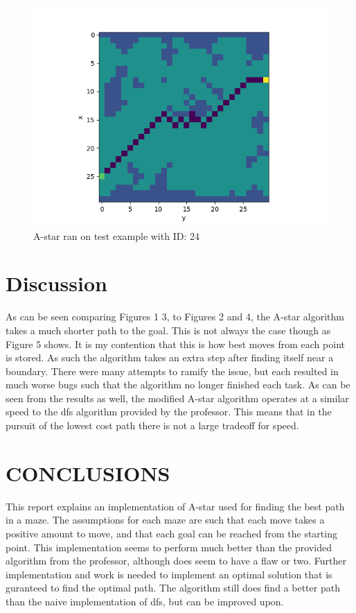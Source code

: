 \documentclass[letterpaper, 10 pt, conference]{ieeeconf}   %
\begin{document}
\begin{figure}[thpb]
	\centering
	\includegraphics[scale=0.5]{images/FAILA.png}
	\caption{A-star ran on test example with ID: 24}
	\label{figurelabel}
\end{figure}

\section{Discussion}
As can be seen comparing Figures 1  3, to Figures 2 and 4, the A-star algorithm takes a much shorter path to the goal. This is not always the case though as Figure 5 shows. It is my contention that this is how best moves from each point is stored. As such the algorithm takes an extra step after finding itself near a boundary. There were many attempts to ramify the issue, but each resulted in much worse bugs such that the algorithm no longer finished each task. As can be seen from the results as well, the modified A-star algorithm operates at a similar speed to the dfs algorithm provided by the professor. This means that in the pursuit of the lowest cost path there is not a large tradeoff for speed.
\section{CONCLUSIONS}
This report explains an implementation of A-star used for finding the best path in a maze. The assumptions for each maze are such that each move takes a positive amount to move, and that each goal can be reached from the starting point. This implementation seems to perform much better than the provided algorithm from the professor, although does seem to have a flaw or two. Further implementation and work is needed to implement an optimal solution that is guranteed to find the optimal path. The algorithm still does find a better path than the naive implementation of dfs, but can be improved upon.
\addtolength{\textheight}{-12cm}   %
\end{document}
